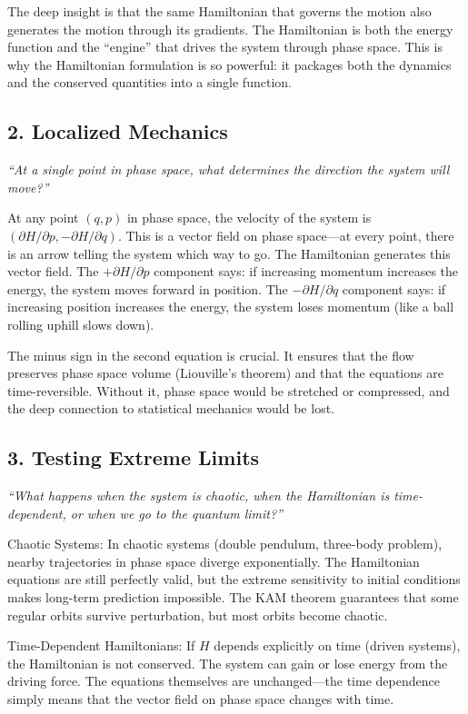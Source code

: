 The deep insight is that the same Hamiltonian that governs the motion also generates the motion through its gradients. The Hamiltonian is both the energy function and the ``engine'' that drives the system through phase space. This is why the Hamiltonian formulation is so powerful: it packages both the dynamics and the conserved quantities into a single function.

\subsection*{2. Localized Mechanics}
\textit{``At a single point in phase space, what determines the direction the system will move?''}

At any point $(q, p)$ in phase space, the velocity of the system is $(\partial H/\partial p, -\partial H/\partial q)$. This is a vector field on phase space---at every point, there is an arrow telling the system which way to go. The Hamiltonian generates this vector field. The $+\partial H/\partial p$ component says: if increasing momentum increases the energy, the system moves forward in position. The $-\partial H/\partial q$ component says: if increasing position increases the energy, the system loses momentum (like a ball rolling uphill slows down).

The minus sign in the second equation is crucial. It ensures that the flow preserves phase space volume (Liouville's theorem) and that the equations are time-reversible. Without it, phase space would be stretched or compressed, and the deep connection to statistical mechanics would be lost.

\subsection*{3. Testing Extreme Limits}
\textit{``What happens when the system is chaotic, when the Hamiltonian is time-dependent, or when we go to the quantum limit?''}

Chaotic Systems: In chaotic systems (double pendulum, three-body problem), nearby trajectories in phase space diverge exponentially. The Hamiltonian equations are still perfectly valid, but the extreme sensitivity to initial conditions makes long-term prediction impossible. The KAM theorem guarantees that some regular orbits survive perturbation, but most orbits become chaotic.

Time-Dependent Hamiltonians: If $H$ depends explicitly on time (driven systems), the Hamiltonian is not conserved. The system can gain or lose energy from the driving force. The equations themselves are unchanged---the time dependence simply means that the vector field on phase space changes with time.

